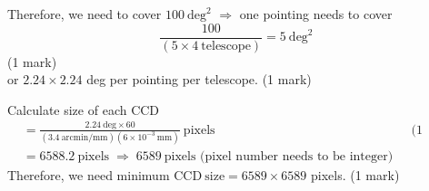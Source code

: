 \begin{description}
Therefore, we need to cover $100~\mathrm{deg}^2$ $\Rightarrow$ one pointing
needs to cover
\[ \frac{100}{(5 \times 4~\text{telescope})} = 5~\mathrm{deg}^2 \]
\hfill(1 mark)\\
or $2.24 \times 2.24$ deg per pointing per telescope. \hfill(1 mark)

Calculate size of each CCD
\begin{align*}
  &= \frac{2.24~\mathrm{deg} \times 60}
     {(3.4~\mathrm{arcmin/mm})(6 \times 10^{-3}~\mathrm{mm})}~\text{pixels}
  && \text{(1 mark)} \\
  &= 6588.2~\text{pixels}
   \;\Rightarrow\; 6589~\text{pixels (pixel number needs to be integer)}
\end{align*}
Therefore, we need minimum $\mathrm{CCD~size} = 6589 \times 6589$ pixels.
\hfill(1 mark)
\end{description}
